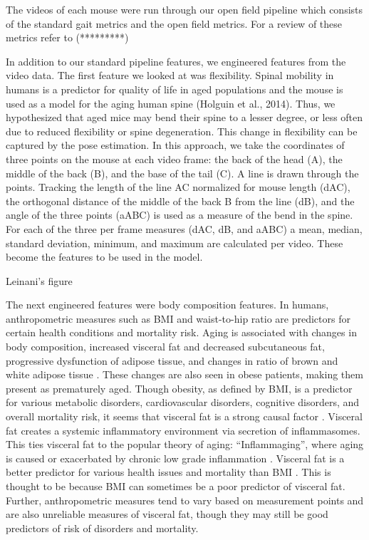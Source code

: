 \documentclass[11pt]{amsart}
\begin{document}
The videos of each mouse were run through our open field pipeline which consists of the standard gait metrics and the open field metrics. For a review of these metrics refer to (*********)

In addition to our standard pipeline features, we engineered features from the video data. The first feature we looked at was flexibility. Spinal mobility in humans is a predictor for quality of life in aged populations \citep{imagama2011back} and the mouse is used as a model for the aging human spine (Holguin et al., 2014). Thus, we hypothesized that aged mice may bend their spine to a lesser degree, or less often due to reduced flexibility or spine degeneration. This change in flexibility can be captured by the pose estimation. In this approach, we take the coordinates of three points on the mouse at each video frame: the back of the head (A), the middle of the back (B), and the base of the tail (C). A line is drawn through the points. Tracking the length of the line AC normalized for mouse length (dAC), the orthogonal distance of the middle of the back B from the line (dB), and the angle of the three points (aABC) is used as a measure of the bend in the spine. For each of the three per frame measures (dAC, dB, and aABC) a mean, median, standard deviation, minimum, and maximum are calculated per video. These become the features to be used in the model.

\begin{center} 

Leinani's figure

\end{center} 

The next engineered features were body composition features. In humans, anthropometric measures such as BMI and waist-to-hip ratio are predictors for certain health conditions and mortality risk. Aging is associated with changes in body composition, increased visceral fat and decreased subcutaneous fat, progressive dysfunction of adipose tissue, and changes in ratio of brown and white adipose tissue \citep{huffman2009role}. These changes are also seen in obese patients, making them present as prematurely aged.  Though obesity, as defined by BMI, is a predictor for various metabolic disorders, cardiovascular disorders, cognitive disorders, and overall mortality risk, it seems that visceral fat is a strong causal factor \citep{huffman2009role}. Visceral fat creates a systemic inflammatory environment via secretion of inflammasomes. This ties visceral fat to the popular theory of aging: ``Inflammaging'', where aging is caused or exacerbated by chronic low grade inflammation \citep{perez2016adipaging}. Visceral fat is a better predictor for various health issues and mortality than BMI \citep{scafoglieri2014use}. This is thought to be because BMI can sometimes be a poor predictor of visceral fat. Further, anthropometric measures tend to vary based on measurement points and are also unreliable measures of visceral fat, though they may still be good predictors of risk of disorders and mortality. 
\end{document}
